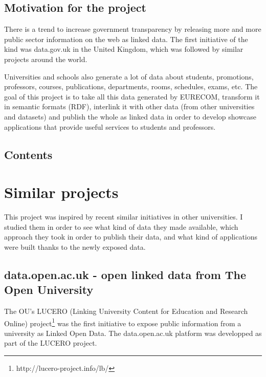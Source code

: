 \documentclass[a4paper,11pt]{report}
\begin{document}
\section*{Motivation for the project}
There is a trend to increase government transparency by releasing more and more public sector information on the web as linked data. The first initiative of the kind was data.gov.uk in the United Kingdom, which was followed by similar projects around the world. 

Universities and schools also generate a lot of data about students, promotions, professors, courses, publications, departments, rooms, schedules, exams, etc. The goal of this project is to take all this data generated by EURECOM, transform it in semantic formats (RDF), interlink it with other data (from other universities and datasets) and publish the whole as linked data in order to develop showcase applications that provide useful services to students and professors. %

\section*{Contents}

\chapter{Similar projects}

This project was inspired by recent similar initiatives in other universities. I studied them in order to see what kind of data they made available, which approach they took in order to publish their data, and what kind of applications were built thanks to the newly exposed data. 
\section*{data.open.ac.uk - open linked data from The Open University}
The OU's LUCERO (Linking University Content for Education and Research Online) project\footnote{http://lucero-project.info/lb/} was the first initiative to expose public information from a university as Linked Open Data. The data.open.ac.uk platform was developped as part of the LUCERO project. 
\end{document}
